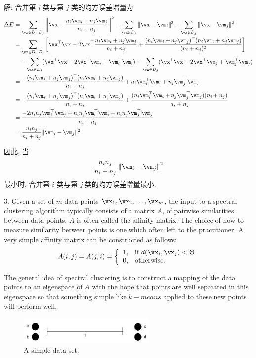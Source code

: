 \documentclass[openany]{ctexbook}
\theoremstyle{kaiti}
\theoremstyle{normal}
\begin{document}
解: 合并第 $i$ 类与第 $j$ 类的均方误差增量为
\begin{equation}
  \begin{aligned}
    \Delta E
    &=\sum_{\vx\in D_i,D_j}\left\|\vx-\frac{n_i\vm_i+n_j\vm_j}{n_i+n_j}\right\|^2-\sum_{\vx\in D_i}\|\vx-\vm_i\|^2-\sum_{\vx\in D_j}\|\vx-\vm_j\|^2\\
    &=\sum_{\vx\in D_i,D_j}\left[\vx^\top\vx-2\vx^\top\frac{n_i\vm_i+n_j\vm_j}{n_i+n_j}+\frac{(n_i\vm_i+n_j\vm_j)^\top(n_i\vm_i+n_j\vm_j)}{(n_i+n_j)^2}\right]\\
    &\quad-\sum_{\vx\in D_i}(\vx^\top\vx-2\vx^\top\vm_i+\vm_i^\top\vm_i)-\sum_{\vx\in D_j}(\vx^\top\vx-2\vx^\top\vm_j+\vm_j^\top\vm_j)\\
    &=-\frac{(n_i\vm_i+n_j\vm_j)^\top(n_i\vm_i+n_j\vm_j)}{n_i+n_j}+n_i\vm_i^\top\vm_i+n_j\vm_j^\top\vm_j\\
    &=-\frac{(n_i\vm_i+n_j\vm_j)^\top(n_i\vm_i+n_j\vm_j)}{n_i+n_j}+\frac{(n_i\vm_i^\top\vm_i+n_j\vm_j^\top\vm_j)(n_i+n_j)}{n_i+n_j}\\
    &=\frac{-2n_in_j\vm_i^\top\vm_j+n_in_j\vm_i^\top\vm_i+n_in_j\vm_j^\top\vm_j}{n_i+n_j}\\
    &=\frac{n_in_j}{n_i+n_j}\|\vm_i-\vm_j\|^2
  \end{aligned}
\end{equation}

因此, 当
\begin{equation}
  \frac{n_i n_j}{n_i+n_j}\left\|\vm_i-\vm_j\right\|^2
\end{equation}
最小时, 合并第 $i$ 类与第 $j$ 类的均方误差增量最小.

3. Given a set of $m$ data points $\vx_1,\vx_2,\dots, \vx_m$, the input to a spectral clustering algorithm typically consists of a matrix $A$, of pairwise similarities between data points. $A$ is often called the affinity matrix. The choice of how to measure similarity between points is one which often left to the practitioner. A very simple affinity matrix can be constructed as follows:
\begin{equation}
  A(i,j)=A(j,i)=\left\{ 
    \begin{array}{ll}
      1, & \text{if}~d(\vx_{i}, \vx_{j})<\Theta \\
      0, & \text{otherwise.} \\
    \end{array} \right.
  \label{eq:affinity}
\end{equation}

The general idea of spectral clustering is to construct a mapping of the data points to an eigenspace of $A$ with the hope that points are well separated in this eigenspace so that something simple like $k-means$ applied to these new points will perform well.
\begin{figure}[ht]
  \centering
  \includegraphics[width=0.6\textwidth]{simple_dataset.jpg}
  \caption{A simple data set.} 
  \label{fig:f1}
\end{figure}
\end{document}
